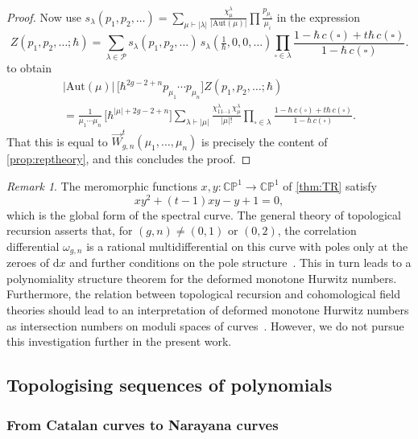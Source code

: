 \documentclass[a4paper]{article}
\theoremstyle{plain}
\numberwithin{theorem}{section}
\theoremstyle{definition}
\theoremstyle{remark}
\newtheorem{remark}[theorem]{Remark}
\newcommand{\dd}{\mathrm{d}}
\newcommand{\h}{\hbar}
\newcommand{\dHN}[3]{\vec{W}^t_{#1,#2}(#3)}
\begin{document}
\begin{proof}
Now use $s_\lambda(p_1, p_2, \ldots) = \displaystyle\sum_{\mu \vdash |\lambda|} \frac{\chi^\lambda_\mu}{|\mathrm{Aut}(\mu)|} \prod \frac{p_{\mu_i}}{\mu_i}$ in the expression
\[
Z(p_1, p_2, \ldots; \h) = \sum_{\lambda \in \mathcal{P}} s_\lambda(p_1, p_2, \ldots) \, s_\lambda ( \tfrac{1}{\h}, 0, 0, \ldots ) \prod_{\square \in \lambda} \frac{1 - \h \, c(\square) + t \h \, c(\square)}{1 - \h \, c(\square)}.
\]
to obtain
\begin{multline*}
|\mathrm{Aut}(\mu)| \, \big[ \h^{2g-2+n} p_{\mu_1} \cdots p_{\mu_n} \big] Z(p_1, p_2, \ldots; \h) \\
= \frac{1}{\mu_1 \cdots \mu_n} \, \big[ \h^{|\mu|+2g-2+n} \big] \sum_{\lambda \vdash |\mu|} \frac{\chi^\lambda_{11 \cdots 1} \, \chi^\lambda_\mu}{|\mu|!} \prod_{\square \in \lambda} \frac{1 - \h \, c(\square) + t \h \, c(\square)}{1 - \h \, c(\square)}.
\end{multline*}
That this is equal to $\dHN{g}{n}{\mu_1, \ldots, \mu_n}$ is precisely the content of \cref{prop:reptheory}, and this concludes the proof.
\end{proof}


\begin{remark}
The meromorphic functions $x, y: \mathbb{CP}^1 \to \mathbb{CP}^1$ of \cref{thm:TR} satisfy
\[
xy^2 + (t-1)xy - y + 1 = 0,
\]
which is the global form of the spectral curve. The general theory of topological recursion asserts that, for $(g,n) \neq (0,1)$ or $(0,2)$, the correlation differential $\omega_{g,n}$ is a rational multidifferential on this curve with poles only at the zeroes of $\dd x$ and further conditions on the pole structure~\cite{eyn-ora07}. This in turn leads to a polynomiality structure theorem for the deformed monotone Hurwitz numbers. Furthermore, the relation between topological recursion and cohomological field theories should lead to an interpretation of deformed monotone Hurwitz numbers as intersection numbers on moduli spaces of curves~\cite{eyn14, DOSS14}. However, we do not pursue this investigation further in the present work.
\end{remark}



\subsection{Topologising sequences of polynomials}

\subsubsection*{From Catalan curves to Narayana curves}
\end{document}
